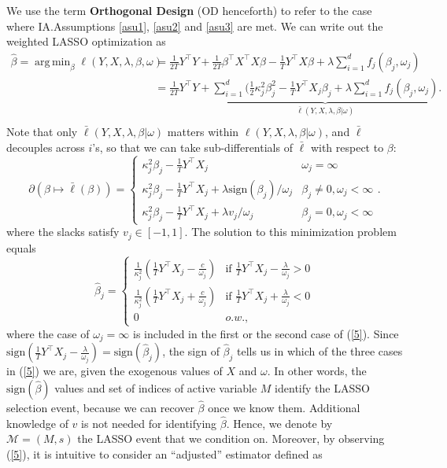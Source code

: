 \documentclass[11pt]{article}
\newcommand{\pa}{\partial}
\newcommand{\sgn}{\textrm{sign}}
\DeclareMathOperator*{\argmin}{arg\,min}
\begin{document}
	We use the term \textbf{Orthogonal Design} (OD henceforth) to refer to the case where IA.Assumptions \ref{asu1}, \ref{asu2} and \ref{asu3} are met. We can write out the weighted LASSO optimization as
	\begin{equation}
		\begin{split}
			\hat{\beta}=\argmin_\beta		\ell(Y,X,\lambda,\beta,\omega)
			&=\frac{1}{2T}Y^\top Y+\frac{1}{2T}\beta^\top X^\top X\beta-\frac{1}{T}Y^\top X\beta+\lambda\sum_{i=1}^df_j(\beta_j,\omega_j)\\
			&=\frac{1}{2T}Y^\top Y+
			\underbrace{\sum_{i=1}^{d}(\frac{1}{2}\kappa_j^2\beta_j^2-\frac{1}{T}Y^\top X_j\beta_j+\lambda\sum_{i=1}^d f_j(\beta_j,\omega_j)}_{\bar{\ell}(Y,X,\lambda,\beta|\omega)} .
			\\
		\end{split}
	\end{equation}
	Note that only $\bar{\ell}(Y,X,\lambda,\beta|\omega)$ matters within $\ell(Y,X,\lambda,\beta|\omega)$, and $\bar{\ell}$ decouples across $i$'s,
	so that we can take sub-differentials of $\bar{\ell}$ with respect to $\beta$:
	\begin{equation}\label{4.0}
		\pa (\beta\mapsto \bar{\ell}(\beta))=\begin{cases}
			\kappa_j^2\beta_j-\frac{1}{T}Y^\top X_j& \omega_j=\infty\\
			\kappa_j^2\beta_j-\frac{1}{T}Y^\top X_j+\lambda\sgn(\beta_j)/\omega_j & \beta_j\neq 0,\omega_j<\infty\\
			\kappa_j^2\beta_j-\frac{1}{T}Y^\top X_j+\lambda v_j/\omega_j& \beta_j= 0,\omega_j<\infty
		\end{cases}.
	\end{equation}
	where the slacks satisfy $v_j\in[-1,1]$. The solution to this minimization problem equals
	\begin{equation}\label{5}
		\hat{\beta}_j=\begin{cases}
			\frac{1}{\kappa_j^2}(\frac{1}{T}Y^\top X_j-\frac{c}{\omega_j})&\text{if } \frac{1}{T}Y^\top X_j-\frac{\lambda}{\omega_j}>0\\
			\frac{1}{\kappa_j^2}(\frac{1}{T}Y^\top X_j+\frac{c}{\omega_j})&\text{if } \frac{1}{T}Y^\top X_j+\frac{\lambda}{\omega_j}<0\\
			0&o.w.,
		\end{cases}
	\end{equation}
	where the case of $\omega_j=\infty$ is included in the first or the second case of (\ref{5}). Since $\sgn(\frac{1}{T}Y^\top X_j-\frac{\lambda}{\omega_j})=\sgn(\hat{\beta}_j)$, the sign of $\hat{\beta}_j$ tells us in which of the three cases in (\ref{5}) we are, given the exogenous values of  $X$ and $\omega$. In other words, the $\sgn(\hat{\beta})$ values and set of indices of active variable $M$ identify the LASSO selection event, because we can recover $\hat{\beta}$ once we know them. Additional knowledge of $v$ is not needed for identifying $\hat{\beta}$. Hence, we denote by $\mathcal{M}=(M,s)$ the LASSO event that we condition on. Moreover, by observing (\ref{5}), it is intuitive to consider an ``adjusted'' estimator defined as
\end{document}
